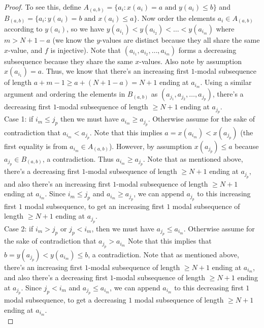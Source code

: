 \documentclass[10pt,a4paper]{amsart}
\begin{document}
\begin{proof}
To see this, define $A_{(a,b)} = \{a_i : x(a_i) = a \text{ and } y(a_i) \leq b\}$ and $B_{(a,b)} = \{a_i : y(a_i) = b \text{ and } x(a_i) \leq a\}$. Now order the elements $a_i \in A_{(a,b)}$ according to $y(a_i)$, so we have $y(a_{i_1}) < y(a_{i_2}) < \ldots < y(a_{i_m})$ where $m > N+1-a$ (we know the $y$-values are distinct because they all share the same $x$-value, and $f$ is injective). Note that $(a_{i_1}, a_{i_2}, \ldots, a_{i_m})$ forms a decreasing subsequence because they share the same $x$-values. Also note by assumption $x(a_{i_1}) = a$. Thus, we know that there's an increasing first $1$-modal subsequence of length $a + m - 1 \geq a + (N+1-a) = N+1$ ending at $a_{i_m}$. Using a similar argument and ordering the elements in $B_{(a,b)}$ as $(a_{j_1}, a_{j_2}, \ldots, a_{j_p})$, there's a decreasing first $1$-modal subsequence of length $\geq N+1$ ending at $a_{j_p}$. \\

Case 1: if $i_m \leq j_p$ then we must have $a_{i_m} \geq a_{j_p}$. Otherwise assume for the sake of contradiction that $a_{i_m} < a_{j_p}$. Note that this implies $a = x(a_{i_m}) < x(a_{j_p})$ (the first equality is from $a_{i_m} \in A_{(a,b)}$). However, by assumption $x(a_{j_p}) \leq a$ because $a_{j_p} \in B_{(a,b)}$, a contradiction. Thus $a_{i_m} \geq a_{j_p}$. Note that as mentioned above, there's a decreasing first $1$-modal subsequence of length $\geq N+1$ ending at $a_{j_p}$, and also there's an increasing first $1$-modal subsequence of length $\geq N+1$ ending at $a_{i_m}$. Since $i_m \leq j_p$ and $a_{i_m} \geq a_{j_p}$, we can append $a_{j_p}$ to this increasing first $1$ modal subsequence, to get an increasing first $1$ modal subsequence of length $\geq N+1$ ending at $a_{j_p}$. \\

Case 2: if $i_m > j_p$ or $j_p < i_m$, then we must have $a_{j_p} \leq a_{i_m}$. Otherwise assume for the sake of contradiction that $a_{j_p} > a_{i_m}$ Note that this implies that $b = y(a_{j_p}) < y(a_{i_m}) \leq b$, a contradiction. Note that as mentioned above, there's an increasing first $1$-modal subsequence of length $\geq N+1$ ending at $a_{i_m}$, and also there's a decreasing first $1$-modal subsequence of length $\geq N+1$ ending at $a_{j_p}$. Since $j_p < i_m$ and $a_{j_p} \leq a_{i_m}$, we can append $a_{i_m}$ to this decreasing first $1$ modal subsequence, to get a decreasing $1$ modal subsequence of length $\geq N+1$ ending at $a_{i_m}$. \\


\end{proof}
\end{document}
